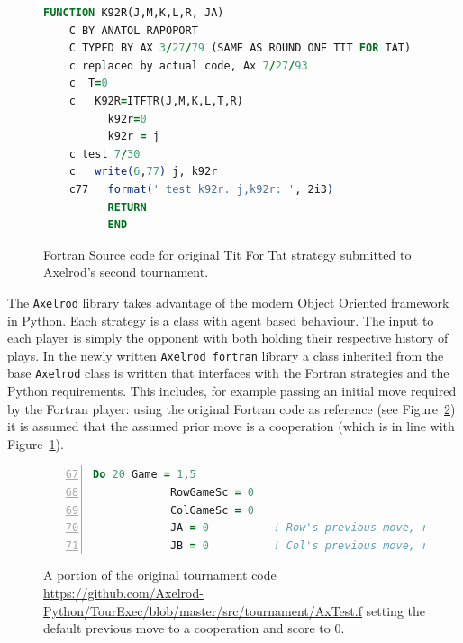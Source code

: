 \documentclass{article}
\begin{document}
\begin{figure}[!hbtp]
    \begin{center}
        \begin{lstlisting}[language=Fortran,
                           basicstyle=\ttfamily,
                           frame=single,
                           keywordstyle=\color{red},
                           commentstyle=\color{green}]
          FUNCTION K92R(J,M,K,L,R, JA)
    C BY ANATOL RAPOPORT
    C TYPED BY AX 3/27/79 (SAME AS ROUND ONE TIT FOR TAT)
    c replaced by actual code, Ax 7/27/93
    c  T=0
    c   K92R=ITFTR(J,M,K,L,T,R)
          k92r=0
          k92r = j
    c test 7/30
    c   write(6,77) j, k92r
    c77   format(' test k92r. j,k92r: ', 2i3)
          RETURN
          END
        \end{lstlisting}
        \caption{Fortran Source code for original Tit For Tat strategy submitted
        to Axelrod's second tournament.}
        \label{fig:tft_fortran}
    \end{center}
\end{figure}


The \texttt{Axelrod} library takes advantage of the modern Object Oriented
framework in Python. Each strategy is a class with agent based behaviour. The
input to each player is simply the opponent with both holding their respective
history of plays. In the newly written \texttt{Axelrod\_fortran} library a
class inherited from the base \texttt{Axelrod} class is written that interfaces
with the Fortran strategies and the Python requirements. This includes, for
example passing an initial move required by the Fortran player: using the
original Fortran code as reference (see Figure~\ref{fig:tournament_code}) it
is assumed that the assumed prior move is
a cooperation (which is in line with Figure~\ref{fig:tft_fortran}).

\begin{figure}[!hbtp]
    \begin{center}
        \begin{lstlisting}[language=Fortran,
                           basicstyle=\ttfamily,
                           frame=single,
                           keywordstyle=\color{red},
                           numbers=left,
                           firstnumber=67,
                           commentstyle=\color{green}]
      Do 20 Game = 1,5
            RowGameSc = 0
            ColGameSc = 0
            JA = 0          ! Row's previous move, reported to column
            JB = 0          ! Col's previous move, reported to row
        \end{lstlisting}
        \caption{A portion of the original tournament code
            \url{https://github.com/Axelrod-Python/TourExec/blob/master/src/tournament/AxTest.f}
            setting the default
        previous move to a cooperation and score to 0.}
        \label{fig:tournament_code}
    \end{center}
\end{figure}
\end{document}

